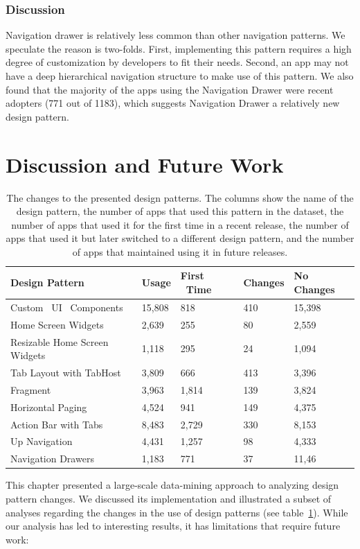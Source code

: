 \subsubsection{Discussion}
Navigation drawer is relatively less common than other navigation patterns. 
We speculate the reason is two-folds. 
First, implementing this pattern requires a high degree of customization by developers to fit their needs. Second, an app may not have a deep hierarchical navigation structure to make use of this pattern. 
We also found that the majority of the apps using the Navigation Drawer were recent adopters (771 out of 1183), which suggests Navigation Drawer a relatively new design pattern.

\section{Discussion and Future Work}
\begin{table}
	\begin{tabular}{| >{\centering\arraybackslash}m{2cm} | m{1cm} | m{1.2cm} | m{1.2cm} | m{1.1cm} |}
		\hline
		\centering Design Pattern & Usage & First \ Time & Changes & No Changes \\
		\hline
		Custom \ UI \ Components & 15,808 & 818 & 410 & 15,398 \tabularnewline
		\hline
		Home Screen Widgets & 2,639 & 255 & 80 & 2,559 \tabularnewline
		\hline
		Resizable Home Screen Widgets & 1,118 & 295 & 24 & 1,094 \tabularnewline
		\hline
		Tab Layout with TabHost & 3,809 & 666 & 413 & 3,396 \tabularnewline
		\hline
		Fragment & 3,963 & 1,814 & 139 & 3,824 \tabularnewline
		\hline
		Horizontal Paging & 4,524 & 941 & 149 & 4,375 \tabularnewline
		\hline
		Action Bar with Tabs & 8,483 & 2,729 & 330 & 8,153 \tabularnewline
		\hline
		Up Navigation & 4,431 & 1,257 & 98 & 4,333 \tabularnewline
		\hline
		Navigation Drawers & 1,183 & 771 & 37 & 11,46 \tabularnewline
		\hline
	\end{tabular}
	\caption{The changes to the presented design patterns. The columns show the name of the design pattern, the number of apps that used this pattern in the dataset, the number of apps that used it for the first time in a recent release, the number of apps that used it but later switched to a different design pattern, and the number of apps that maintained using it in future releases.}
	\label{tab:table_summary}
\end{table}

This chapter presented a large-scale data-mining approach to analyzing design pattern changes.
We discussed its implementation and illustrated a subset of analyses regarding the changes in the use of design patterns (see table~\ref{tab:table_summary}).
While our analysis has led to interesting results, it has limitations that require future work:

